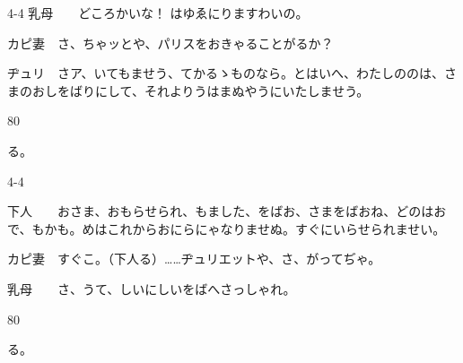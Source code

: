 \documentclass[tate,paper=b6j,jafontsize=9pt]{jlreq}
\begin{document}
\begin{azconvIndented}{4\zw}{-4\zw}
乳母　　どころかいな！ はゆゑにりますわいの。

カピ妻　さ、ちゃッとや、パリスをおきゃることがるか？

ヂュリ　さア、いてもませう、てかるゝものなら。とはいへ、わたしののは、さまのおしをばりにして、それよりうはまぬやうにいたしませう。

\end{azconvIndented}
\begin{azconvIndented}{8\zw}{0\zw}

る。

\end{azconvIndented}
\begin{azconvIndented}{4\zw}{-4\zw}

下人　　おさま、おもらせられ、もました、をばお、さまをばおね、どのはおで、もかも。めはこれからおにらにゃなりませぬ。すぐにいらせられませい。

カピ妻　すぐこ。（下人る）……ヂュリエットや、さ、がってぢゃ。

乳母　　さ、うて、しいにしいをばへさっしゃれ。

\end{azconvIndented}
\begin{azconvIndented}{8\zw}{0\zw}

る。

\end{azconvIndented}

\end{document}
